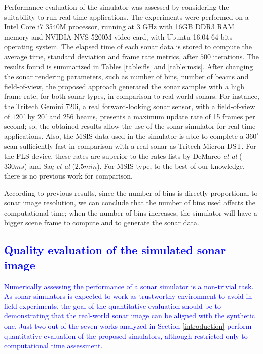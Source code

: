 \documentclass[final,5p,times]{elsarticle}
\begin{document}
Performance evaluation of the simulator was assessed by considering the suitability to run real-time applications. The experiments were performed on a Intel Core i7 3540M processor, running at 3 GHz with 16GB DDR3 RAM memory and NVIDIA NVS 5200M video card, with Ubuntu 16.04 64 bits operating system. The elapsed time of each sonar data is stored to compute the average time, standard deviation and frame rate metrics, after $500$ iterations. The results found is summarized in Tables \ref{table:fls} and \ref{table:msis}. After changing the sonar rendering parameters, such as number of bins, number of beams and field-of-view, the proposed approach generated the sonar samples with a high
frame rate, for both sonar types, in comparison to real-world sonars. For instance, the Tritech Gemini 720i, a real forward-looking sonar sensor, with a field-of-view of $120^{\circ}$ by $20^{\circ}$ and 256 beams, presents a maximum update rate of 15 frames per second; so, the obtained results allow the use of the sonar simulator for real-time applications. Also, the MSIS data used in the simulator is able to complete a $360^{\circ}$ scan sufficiently fast in comparison with a real sonar as Tritech Micron DST. For the FLS device, these rates are superior to the rates lists by DeMarco \textit{et al} \cite{demarco2015} ($330 ms$) and Saç \textit{et al} \cite{sac2015} ($2.5 min$). For MSIS type, to the best of our knowledge, there is no previous work for comparison.

According to previous results, since the number of bins is directly
proportional to sonar image resolution, we can conclude that the number of bins used affects the computational time; when the number of bins increases, the simulator will have a bigger scene frame to compute and to generate the sonar data.

\subsection{\textcolor{blue}{Quality evaluation of the simulated sonar image}}

\textcolor{blue}{Numerically assessing the performance of a sonar simulator is a non-trivial task. As sonar simulators is expected to work as trustworthy environment to avoid in-field experiments, the goal of the quantitative evaluation should be to demonstrating that the real-world sonar image can be aligned with the synthetic one. Just two \cite{sac2015,demarco2015} out of the seven works analyzed in Section \ref{introduction} perform quantitative evaluation of the proposed simulators, although restricted only to computational time assessment.}
\end{document}

